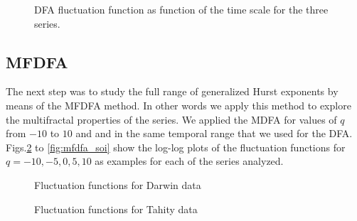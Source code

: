 \documentclass[onecolumn, preprint,aps,amsmath, amssymb, superscriptaddress]{revtex4}
\begin{document}
\begin{figure}
\caption{DFA fluctuation function as function of the time scale for the three series.}
\label{fig:dfa}
\end{figure}

\subsection{MFDFA}
\label{results_mfdfa}

The next step was to study the full range of generalized Hurst exponents by means of the MFDFA method. In other words we apply this method to explore the multifractal properties of the series. We applied the MDFA for values of $q$ from $-10$ to $10$ and and in the same temporal range that we used for the DFA. Figs.\ref{fig:mfdfa_dar} to \ref{fig:mfdfa_soi} show the log-log plots of the fluctuation functions for $q=-10,-5,0,5,10$ as examples for each of the series analyzed.

\begin{figure}
\caption{Fluctuation functions for Darwin data}
\label{fig:mfdfa_dar}
\end{figure}

\begin{figure}
\caption{Fluctuation functions for Tahity data}
\label{fig:mfdfa_tah}
\end{figure}
\end{document}
